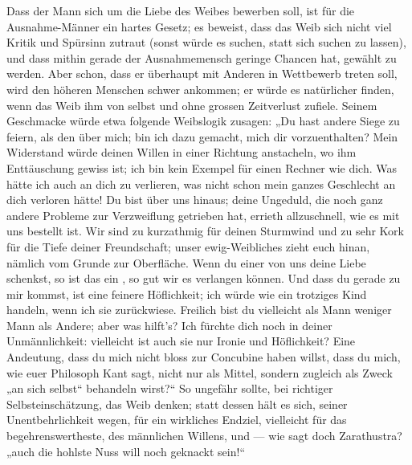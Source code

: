 Dass der Mann sich um die Liebe des Weibes bewerben soll, ist für die Ausnahme-Männer ein hartes Gesetz; es beweist, dass das Weib sich nicht viel Kritik und Spürsinn zutraut (sonst würde es suchen, statt sich suchen zu lassen), und dass mithin gerade der Ausnahmemensch geringe Chancen hat, gewählt zu werden. Aber schon, dass er überhaupt mit Anderen in Wettbewerb treten soll, wird den höheren Menschen schwer ankommen; er würde es natürlicher finden, wenn das Weib ihm von selbst und ohne grossen Zeitverlust zufiele. Seinem Geschmacke würde etwa folgende Weibslogik zusagen: „Du hast andere Siege zu feiern, als den über mich; bin ich dazu gemacht, mich dir vorzuenthalten? Mein Widerstand würde deinen Willen in einer Richtung anstacheln, wo ihm Enttäuschung gewiss ist; ich bin kein Exempel für einen Rechner wie dich. Was hätte ich auch an dich zu verlieren, was nicht schon mein ganzes Geschlecht an dich verloren hätte! Du bist über uns hinaus; deine Ungeduld, die noch ganz andere Probleme zur Verzweiflung getrieben hat, errieth allzuschnell, wie es mit uns bestellt ist. Wir sind zu kurzathmig für deinen Sturmwind und zu sehr Kork für die Tiefe deiner Freundschaft; unser ewig-Weibliches zieht euch hinan, nämlich vom Grunde zur Oberfläche. Wenn du einer von uns deine Liebe schenkst, so ist das ein , so gut wir es verlangen können. Und dass du gerade zu mir kommst, ist eine feinere Höflichkeit; ich würde wie ein trotziges Kind handeln, wenn ich sie zurückwiese. Freilich bist du vielleicht als Mann weniger Mann als Andere; aber was hilft’s? Ich fürchte dich noch in deiner Unmännlichkeit: vielleicht ist auch sie nur Ironie und Höflichkeit? Eine Andeutung, dass du mich nicht bloss zur Concubine haben willst, dass du mich, wie euer Philosoph Kant sagt, nicht nur als Mittel, sondern zugleich als Zweck „an sich selbst“ behandeln wirst?“ So ungefähr sollte, bei richtiger Selbsteinschätzung, das Weib denken; statt dessen hält es sich, seiner Unentbehrlichkeit wegen, für ein wirkliches Endziel, vielleicht für das begehrenswertheste, des männlichen Willens, und — wie sagt doch Zarathustra? „auch die hohlste Nuss will noch geknackt sein!“
\par

